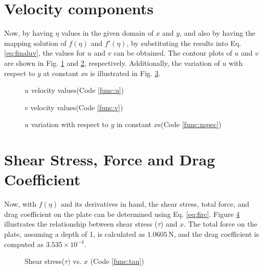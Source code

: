 \documentclass[]{report}
\begin{document}
\section{Velocity components}

Now, by having $\eta$ values in the given domain of $x$ and $y$, and also by having the mapping solution of $f(\eta)$ and $f'(\eta)$, by substituting the results into Eq.\ref{eq:finaluv}, the values for $u$ and $v$ can be obtained. The contour plots of $u$ and $v$ are shown in Fig. \ref{fig:u} and \ref{fig:v}, respectively. Additionally, the variation of $u$ with respect to $y$ at constant $x$s is illustrated in Fig. \ref{fig:diff_x}.

\begin{figure}
    \centering
    
    \caption{$u$ velocity values(Code \ref{func:u})}
    \label{fig:u}
\end{figure}

\begin{figure}
    \centering
    
    \caption{$v$ velocity values(Code \ref{func:v})}
    \label{fig:v}
\end{figure}

\begin{figure}
    \centering
    
    \caption{$u$ variation with respect to $y$ in constant $x$s(Code \ref{func:xspec})}
    \label{fig:diff_x}
\end{figure}

\section{Shear Stress, Force and Drag Coefficient}

Now, with $f(\eta)$ and its derivatives in hand, the shear stress, total force, and drag coefficient on the plate can be determined using Eq. \ref{eq:firc}. Figure \ref{fig:tau} illustrates the relationship between shear stress ($\tau$) and $x$. The total force on the plate, assuming a depth of 1, is calculated as $1.0605 \, \text{N}$, and the drag coefficient is computed as $3.535 \times 10^{-4}$.
\begin{figure}
    \centering
    
    \caption{Shear stress($\tau)$ vs. $x$ (Code \ref{func:tau})}
    \label{fig:tau}
\end{figure}
\end{document}
